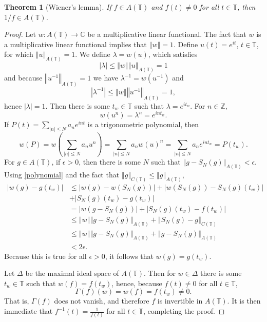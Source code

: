 \documentclass{article}
\newcommand{\norm}[1]{\left\Vert #1 \right\Vert}
\newtheorem{theorem}{Theorem}
\theoremstyle{definition}
\begin{document}
\begin{theorem}[Wiener's lemma]
If $f \in A(\mathbb{T})$ and $f(t) \neq 0$ for all $t \in \mathbb{T}$, then $1/f \in A(\mathbb{T})$.
\label{wienerlemma}
\end{theorem}
\begin{proof}
Let $w:A(\mathbb{T}) \to \mathbb{C}$ be a multiplicative linear functional. The fact that
$w$ is a multiplicative linear functional implies that $\norm{w} = 1$.  
Define $u(t)=e^{it}$,
$t \in \mathbb{T}$, for which $\norm{u}_{A(\mathbb{T})}=1$. 
We  define $\lambda = w(u)$, which satisfies
\[
|\lambda| \leq \norm{w} \norm{u}_{A(\mathbb{T})} = 1
\]
and because $\norm{u^{-1}}_{A(\mathbb{T})}=1$ we have $\lambda^{-1}=w(u^{-1})$ and 
\[
|\lambda^{-1}| \leq \norm{w} \norm{u^{-1}}_{A(\mathbb{T})} = 1,
\]
hence $|\lambda|=1$. Then there is some $t_w \in \mathbb{T}$ such that
$\lambda=e^{it_w}$.
For $n \in \mathbb{Z}$,
\[
w(u^n) = \lambda^n = e^{int_w}.
\]
If $P(t)=\sum_{|n| \leq N} a_n e^{int}$ is a trigonometric polynomial, then
\begin{equation}
w(P) = w\left( \sum_{|n| \leq N} a_n u^n\right) = \sum_{|n| \leq N} a_n w(u)^n = 
\sum_{|n| \leq N} a_n e^{int_w}=P(t_w).
\label{polynomial}
\end{equation}
For $g \in A(\mathbb{T})$,
if $\epsilon>0$, then there is some $N$ such that $\norm{g-S_N(g)}_{A(\mathbb{T})}<\epsilon$. Using \eqref{polynomial} and the fact
that $\norm{g}_{C(\mathbb{T})} \leq \norm{g}_{A(\mathbb{T})}$,
\begin{align*}
|w(g)-g(t_w)| &\leq |w(g)-w(S_N(g))|+|w(S_N(g))-S_N(g)(t_w)|\\
&+|S_N(g)(t_w)-g(t_w)|\\
&=|w(g-S_N(g))|+|S_N(g)(t_w)-f(t_w)|\\
&\leq \norm{w} \norm{g-S_N(g)}_{A(\mathbb{T})} + \norm{S_N(g)-g}_{C(\mathbb{T})}\\
&\leq \norm{w} \norm{g-S_N(g)}_{A(\mathbb{T})} +\norm{g-S_N(g)}_{A(\mathbb{T})}\\
&<2\epsilon.
\end{align*}
Because this is true for all $\epsilon>0$, it follows that $w(g)=g(t_w)$. 


Let $\Delta$ be the maximal ideal space of $A(\mathbb{T})$.
Then for $w \in \Delta$ there is some $t_w \in \mathbb{T}$ such that $w(f)=f(t_w)$, hence, because $f(t) \neq 0$ for all
$t \in \mathbb{T}$,
\[
\Gamma(f)(w)=w(f)=f(t_w) \neq 0.
\]
That is, $\Gamma(f)$ does not vanish, and therefore $f$ is invertible in $A(\mathbb{T})$. It is then immediate that
$f^{-1}(t)=\frac{1}{f(t)}$ for all $t \in \mathbb{T}$, completing the proof.
\end{proof}
\end{document}
